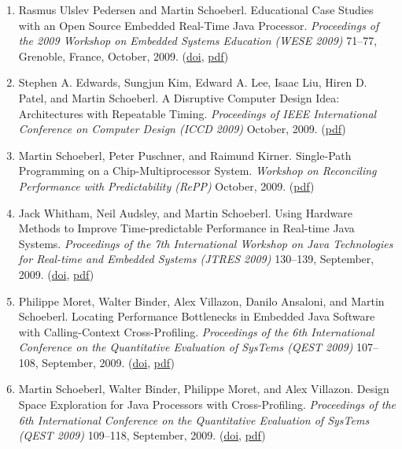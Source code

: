 \begin{enumerate}
\item Rasmus Ulslev Pedersen and Martin Schoeberl.
 Educational Case Studies with an Open Source Embedded Real-Time Java Processor.
 \emph{Proceedings of the 2009 Workshop on Embedded Systems Education (WESE 2009)} 71--77, Grenoble, France, October, 2009.
(\href{http://dx.doi.org/10.1145/1719010.1719022}{doi}, \href{http://www.jopdesign.com/doc/jopedu.pdf}{pdf})

\item Stephen A. Edwards, Sungjun Kim, Edward A. Lee, Isaac Liu, Hiren D. Patel, and Martin Schoeberl.
 A Disruptive Computer Design Idea: Architectures with Repeatable Timing.
 \emph{Proceedings of IEEE International Conference on Computer Design (ICCD 2009)} October, 2009.
(\href{http://www.jopdesign.com/doc/pret_iccd.pdf}{pdf})

\item Martin Schoeberl, Peter Puschner, and Raimund Kirner.
 Single-Path Programming on a Chip-Multiprocessor System.
 \emph{Workshop on Reconciling Performance with Predictability (RePP)} October, 2009.
(\href{http://www.jopdesign.com/doc/spcmp_repp.pdf}{pdf})

\item Jack Whitham, Neil Audsley, and Martin Schoeberl.
 Using Hardware Methods to Improve Time-predictable Performance in Real-time Java Systems.
 \emph{Proceedings of the 7th International Workshop on Java Technologies for Real-time and Embedded Systems (JTRES 2009)} 130--139, September, 2009.
(\href{http://dx.doi.org/10.1145/1620405.1620424}{doi}, \href{http://www.jopdesign.com/doc/hwmethods.pdf}{pdf})

\item Philippe Moret, Walter Binder, Alex Villazon, Danilo Ansaloni, and Martin Schoeberl.
 Locating Performance Bottlenecks in Embedded Java Software with Calling-Context Cross-Profiling.
 \emph{Proceedings of the 6th International Conference on the Quantitative Evaluation of SysTems (QEST 2009)} 107--108, September, 2009.
(\href{http://dx.doi.org/10.1109/QEST.2009.40}{doi}, \href{http://www.jopdesign.com/doc/qest09_demo.pdf}{pdf})

\item Martin Schoeberl, Walter Binder, Philippe Moret, and Alex Villazon.
 Design Space Exploration for Java Processors with Cross-Profiling.
 \emph{Proceedings of the 6th International Conference on the Quantitative Evaluation of SysTems (QEST 2009)} 109--118, September, 2009.
(\href{http://dx.doi.org/10.1109/QEST.2009.15}{doi}, \href{http://www.jopdesign.com/doc/profarch_qest2009.pdf}{pdf})


\end{enumerate}
